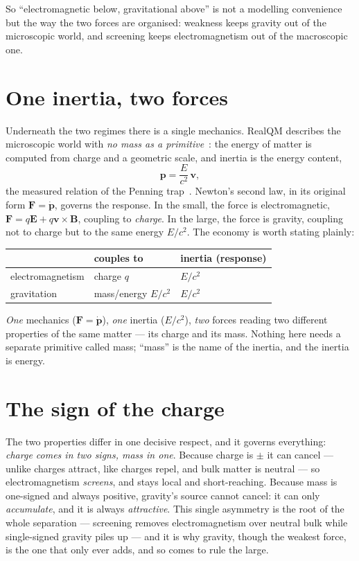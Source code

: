 \documentclass[11pt]{article}
\begin{document}
So ``electromagnetic below, gravitational above'' is not a modelling convenience but the way the two forces are
organised: weakness keeps gravity out of the microscopic world, and screening keeps electromagnetism out of the
macroscopic one.

\section{One inertia, two forces}
Underneath the two regimes there is a single mechanics. RealQM describes the microscopic world with \emph{no mass
as a primitive}~\cite{NoMass}: the energy of matter is computed from charge and a geometric scale, and inertia is
the energy content,
\begin{equation}
\mathbf p=\frac{E}{c^2}\,\mathbf v ,
\label{eq:inertia}
\end{equation}
the measured relation of the Penning trap~\cite{NoMass}. Newton's second law, in its original form
$\mathbf F=\dot{\mathbf p}$, governs the response. In the small, the force is electromagnetic,
$\mathbf F=q\mathbf E+q\mathbf v\times\mathbf B$, coupling to \emph{charge}. In the large, the force is gravity,
coupling not to charge but to the same energy $E/c^2$. The economy is worth stating plainly:
\begin{center}
\begin{tabular}{lll}
\hline
 & couples to & inertia (response) \\
\hline
electromagnetism & charge $q$ & $E/c^2$ \\
gravitation      & mass/energy $E/c^2$ & $E/c^2$ \\
\hline
\end{tabular}
\end{center}
\emph{One} mechanics ($\mathbf F=\dot{\mathbf p}$), \emph{one} inertia ($E/c^2$), \emph{two} forces reading two
different properties of the same matter --- its charge and its mass. Nothing here needs a separate primitive called
mass; ``mass'' is the name of the inertia, and the inertia is energy.

\section{The sign of the charge}
The two properties differ in one decisive respect, and it governs everything: \emph{charge comes in two signs,
mass in one}. Because charge is $\pm$ it can cancel --- unlike charges attract, like charges repel, and bulk matter
is neutral --- so electromagnetism \emph{screens}, and stays local and short-reaching. Because mass is one-signed
and always positive, gravity's source cannot cancel: it can only \emph{accumulate}, and it is always
\emph{attractive}. This single asymmetry is the root of the whole separation --- screening removes electromagnetism
over neutral bulk while single-signed gravity piles up --- and it is why gravity, though the weakest force, is the
one that only ever adds, and so comes to rule the large.
\end{document}
